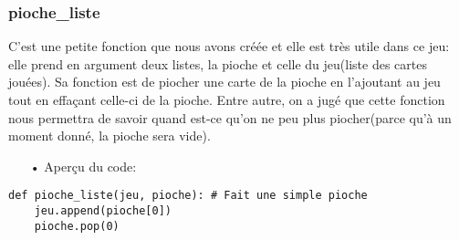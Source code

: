	\subsubsection{pioche\_liste}
	C'est une petite fonction que nous avons créée et elle est très utile dans ce jeu: elle prend en argument deux listes, la pioche et celle du jeu(liste des cartes jouées). Sa fonction est de piocher une carte de la pioche en l'ajoutant au jeu tout en effaçant celle-ci de la pioche. Entre autre, on a jugé que cette fonction nous permettra de savoir quand est-ce qu'on ne peu plus piocher(parce qu'à un moment donné, la pioche sera vide).
	\\
	\begin{itemize}
	\color{blue}\item[•]Aperçu du code:
	\end{itemize}
	
	\lstset{language=Python}
	\lstset{frame=lines}
	\lstset{basicstyle=\footnotesize}
	\begin{lstlisting}
def pioche_liste(jeu, pioche): # Fait une simple pioche
    jeu.append(pioche[0])
    pioche.pop(0)
	\end{lstlisting}	